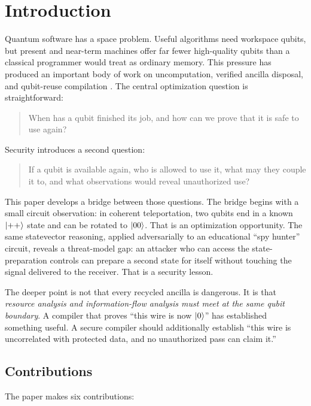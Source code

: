 \section{Introduction}
\label{sec:introduction}

Quantum software has a space problem. Useful algorithms need workspace qubits,
but present and near-term machines offer far fewer high-quality qubits than a
classical programmer would treat as ordinary memory. This pressure has produced
an important body of work on uncomputation, verified ancilla disposal, and
qubit-reuse compilation \cite{rand2019reqwire,decross2023reuse,venev2024uncomputation}.
The central optimization question is straightforward:

\begin{quote}
When has a qubit finished its job, and how can we prove that it is safe to use
again?
\end{quote}

Security introduces a second question:

\begin{quote}
If a qubit is available again, who is allowed to use it, what may they couple it
to, and what observations would reveal unauthorized use?
\end{quote}

This paper develops a bridge between those questions. The bridge begins with a
small circuit observation: in coherent teleportation, two qubits end in a known
$\ket{++}$ state and can be rotated to $\ket{00}$. That is an optimization
opportunity. The same statevector reasoning, applied adversarially to an
educational ``spy hunter'' circuit, reveals a threat-model gap: an attacker who
can access the state-preparation controls can prepare a second state for itself
without touching the signal delivered to the receiver. That is a security
lesson.

The deeper point is not that every recycled ancilla is dangerous. It is that
\emph{resource analysis and information-flow analysis must meet at the same
qubit boundary}. A compiler that proves ``this wire is now $\ket{0}$'' has
established something useful. A secure compiler should additionally establish
``this wire is uncorrelated with protected data, and no unauthorized pass can
claim it.''

\subsection{Contributions}

The paper makes six contributions:

